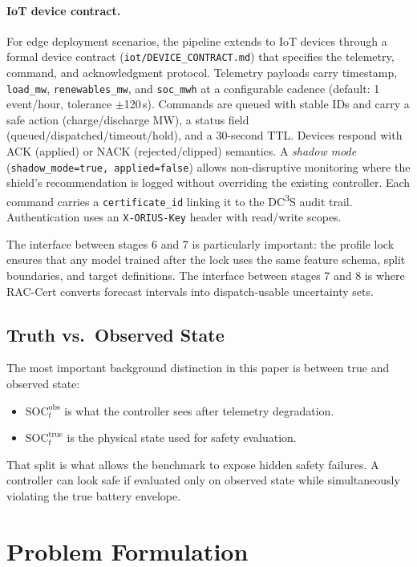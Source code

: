 \documentclass[11pt,a4paper]{article}
\begin{document}
\paragraph{IoT device contract.}
For edge deployment scenarios, the pipeline extends to IoT devices through a formal device contract (\texttt{iot/DEVICE\_CONTRACT.md}) that specifies the telemetry, command, and acknowledgment protocol. Telemetry payloads carry timestamp, \texttt{load\_mw}, \texttt{renewables\_mw}, and \texttt{soc\_mwh} at a configurable cadence (default: 1 event/hour, tolerance $\pm$120\,s). Commands are queued with stable IDs and carry a safe action (charge/discharge MW), a status field (queued/dispatched/timeout/hold), and a 30-second TTL. Devices respond with ACK (applied) or NACK (rejected/clipped) semantics. A \emph{shadow mode} (\texttt{shadow\_mode=true, applied=false}) allows non-disruptive monitoring where the shield's recommendation is logged without overriding the existing controller. Each command carries a \texttt{certificate\_id} linking it to the DC\textsuperscript{3}S audit trail. Authentication uses an \texttt{X-ORIUS-Key} header with read/write scopes.

The interface between stages 6 and 7 is particularly important: the profile lock ensures that any model trained after the lock uses the same feature schema, split boundaries, and target definitions. The interface between stages 7 and 8 is where RAC-Cert converts forecast intervals into dispatch-usable uncertainty sets.

\subsection{Truth vs.\ Observed State}

The most important background distinction in this paper is between true and observed state:
\begin{itemize}[leftmargin=*,topsep=2pt,itemsep=1pt]
  \item $\mathrm{SOC}^{\mathrm{obs}}_t$ is what the controller sees after telemetry degradation.
  \item $\mathrm{SOC}^{\mathrm{true}}_t$ is the physical state used for safety evaluation.
\end{itemize}

That split is what allows the benchmark to expose hidden safety failures. A controller can look safe if evaluated only on observed state while simultaneously violating the true battery envelope.

\section{Problem Formulation}\label{sec:problem}
\end{document}
